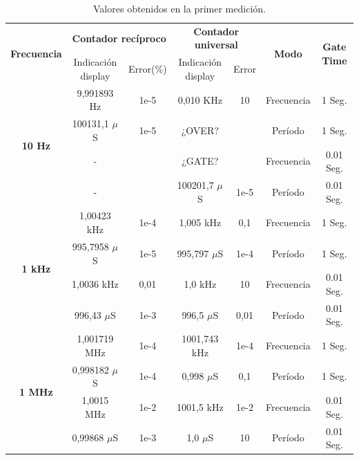 \documentclass{article}
\begin{document}
\newpage
\begin{table}[!hbt]
	\begin{center}

		\begin{tabular}{|c|c|c|c|c|c|c|} \hline
			\multirow{2}{*}{\textbf{Frecuencia}}
			& \multicolumn{2}{c|}{\textbf{Contador recíproco}} & \multicolumn{2}{c|}{\textbf{Contador universal}} & \multirow{2}{*}{\textbf{Modo}} & \multirow{2}{*}{\textbf{Gate Time}} \\\cline{2-5}
			& Indicación display & Error(\%) & Indicación display & Error & & \\\hline
			
			\multirow{4}{*}{\textbf{10 Hz}}
			& 9,991893 Hz & 1e-5  & 0,010 KHz & 10 & Frecuencia & 1 Seg. \\\cline{2-7}
			& 100131,1 $\mu$S & 1e-5 & ¿OVER? &  & Período & 1 Seg. \\\cline{2-7}
			& - &  & ¿GATE? &  & Frecuencia & 0.01 Seg. \\\cline{2-7}
			& - &  & 100201,7 $\mu$S & 1e-5  & Período & 0.01 Seg. \\\hline

			\multirow{4}{*}{\textbf{1 kHz}}
			& 1,00423 kHz & 1e-4  & 1,005 kHz & 0,1  & Frecuencia & 1 Seg. \\\cline{2-7}
			& 995,7958 $\mu$S & 1e-5 & 995,797 $\mu$S & 1e-4 & Período & 1 Seg. \\\cline{2-7}
			& 1,0036 kHz & 0,01 & 1,0 kHz & 10 & Frecuencia & 0.01 Seg. \\\cline{2-7}
			& 996,43 $\mu$S & 1e-3 & 996,5 $\mu$S & 0,01 & Período & 0.01 Seg. \\\hline

			\multirow{4}{*}{\textbf{1 MHz}}
			& 1,001719 MHz & 1e-4 & 1001,743 kHz & 1e-4 & Frecuencia & 1 Seg. \\\cline{2-7}
			& 0,998182 $\mu$S & 1e-4 & 0,998 $\mu$S & 0,1 & Período & 1 Seg. \\\cline{2-7}
			& 1,0015 MHz & 1e-2 & 1001,5 kHz & 1e-2 & Frecuencia & 0.01 Seg. \\\cline{2-7}
			& 0,99868 $\mu$S & 1e-3 & 1,0 $\mu$S & 10 & Período & 0.01 Seg. \\\hline
		\end{tabular}

	\caption{Valores obtenidos en la primer medición.}
	\end{center}
\end{table}
\medskip
\end{document}
